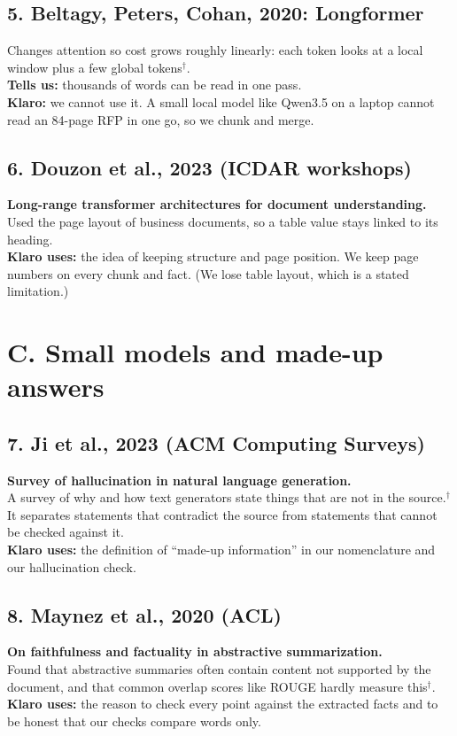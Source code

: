 \subsection*{5. Beltagy, Peters, Cohan, 2020: Longformer}
Changes attention so cost grows roughly linearly: each token looks at a local window plus a few global tokens$^\dagger$.\\
\textbf{Tells us:} thousands of words can be read in one pass.\\
\textbf{Klaro:} we cannot use it. A small local model like Qwen3.5 on a laptop cannot read an 84-page RFP in one go, so we chunk and merge.

\subsection*{6. Douzon et al., 2023 (ICDAR workshops)}
\textbf{Long-range transformer architectures for document understanding.}\\
Used the page layout of business documents, so a table value stays linked to its heading.\\
\textbf{Klaro uses:} the idea of keeping structure and page position. We keep page numbers on every chunk and fact. (We lose table layout, which is a stated limitation.)

\section{C. Small models and made-up answers}

\subsection*{7. Ji et al., 2023 (ACM Computing Surveys)}
\textbf{Survey of hallucination in natural language generation.}\\
A survey of why and how text generators state things that are not in the source.$^\dagger$ It separates statements that contradict the source from statements that cannot be checked against it.\\
\textbf{Klaro uses:} the definition of ``made-up information'' in our nomenclature and our hallucination check.

\subsection*{8. Maynez et al., 2020 (ACL)}
\textbf{On faithfulness and factuality in abstractive summarization.}\\
Found that abstractive summaries often contain content not supported by the document, and that common overlap scores like ROUGE hardly measure this$^\dagger$.\\
\textbf{Klaro uses:} the reason to check every point against the extracted facts and to be honest that our checks compare words only.

